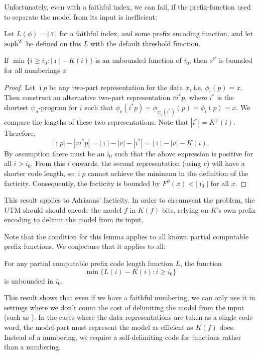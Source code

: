 \documentclass{style/llncs}
\newcommand{\C}{\mathscr C}
\newcommand{\tn}[1]{\textnormal{#1}}
\newcommand{\s}{\tn{soph}}
\begin{document}
Unfortunately, even with a faithful index, we can fail, if the prefix-function used to separate the model from its input is inefficient:

\begin{lemma}
Let $L(\phi) = |\bar\imath|$ for a faithful index, and some prefix encoding function, and let $\s^\C$ be defined on this $L$ with the default threshold function.

If $\min\{i\ge i_0:|\bar\imath|-K(i)\}$ is an unbounded function of $i_0$, then $s^\C$ is bounded for all numberings $\phi$
\end{lemma}
\begin{proof}
Let $\bar\imath p$ be any two-part representation for the data $x$, i.e. $\phi_i(p)=x$. Then construct an alternative two-part representation $\bar vi^* p$, where $i^*$ is the shortest $\psi_u$-program for $i$ such that $\phi_v(i^* p)=\phi_{\psi_u(i^*)}(p) = \phi_i(p)=x$. We compare the lengths of these two representations. Note that $|i^*|=K^\psi(i)$. Therefore,
\[
|\bar\imath p|-|\bar v i^* p| = |\bar\imath|-|\bar v| - |i^*| = |\bar\imath|-|\bar v|-K(i).
\]
By assumption there must be an $i_0$ such that the above expression is positive for all $i>i_0$. From this $i$ onwards, the second representation (using $v$) will have a shorter code length, so $\bar\imath p$ cannot achieve the minimum in the definition of the facticity. Consequently, the facticity is bounded by $F^\phi(x)<|\overline{\imath_0}|$ for all $x$. 
\end{proof}
This result applies to Adriaans' facticity\cite{adriaans2012facticity}. In order to circumvent the problem, the UTM should should encode the model $f$ in $K(f)$ bits, relying on $K$'s own prefix encoding to delimit the model from its input. 

Note that the condition for this lemma applies to all known partial computable prefix functions. We conjecture that it applies to all:

\begin{conjecture}
For any partial computable prefix code length function $L$, the function
\[
\min\{L(i)-K(i):i\ge i_0\}
\]
is unbounded in $i_0$.
\end{conjecture}

This result shows that even if we have a faithful numbering, we can only use it in settings where we don't count the cost of delimiting the model from the input (such as \cite{koppelSoph1988}). In the cases where the data representations are taken as a single code word, the model-part must represent the model as efficient as $K(f)$ does. Instead of a numbering, we require a self-delimiting code for functions rather than a numbering. 
\end{document}
